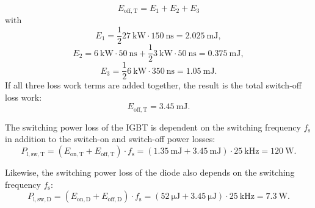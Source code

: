 \begin{solutionblock}
    \begin{equation}
    E_{\mathrm{off,T}} = E_{\mathrm{1}} + E_{\mathrm{2}} + E_{\mathrm{3}}
    \end{equation}
    with
    \begin{equation}
    E_{\mathrm{1}} = \frac{1}{2} \SI{27}{\kilo\watt} \cdot \SI{150}{\ns} = \SI {2.025}{\milli\joule},
    \end{equation}
    \begin{equation}
    E_{\mathrm{2}} = \SI{6}{\kilo\watt} \cdot \SI{50}{\ns} + \frac{1}{2} \SI{3}{\kilo\watt} \cdot \SI{50}{\ns} = \SI {0.375}{\milli\joule},
    \end{equation}
    \begin{equation}
        E_{\mathrm{3}} = \frac{1}{2} \SI{6}{\kilo\watt} \cdot \SI{350}{\ns} = \SI {1.05}{\milli\joule}.
        \end{equation}
    If all three loss work terms are added together, the result is the total switch-off loss work:
    \begin{equation}
        E_{\mathrm{off,T}} =  \SI {3.45}{\milli\joule}.
    \end{equation}

    

\end{solutionblock}


\begin{solutionblock}
The switching power loss of the IGBT is dependent on the switching frequency $f_{\mathrm{s}}$ in addition to the switch-on and switch-off power losses:
\begin{equation}
    P_{\mathrm{l,sw,T}} =  (E_{\mathrm{on,T}} +  E_{\mathrm{off,T}}) \cdot f_{\mathrm{s}} = (\SI {1.35}{\milli\joule} + \SI {3.45}{\milli\joule}) \cdot \SI {25}{\kilo\hertz} = \SI {120}{\watt}.
 \end{equation}

 Likewise, the switching power loss of the diode also depends on the switching frequency $f_{\mathrm{s}}$:
 \begin{equation}
    P_{\mathrm{l,sw,D}} =  (E_{\mathrm{on,D}} +  E_{\mathrm{off,D}}) \cdot f_{\mathrm{s}} = (\SI {52}{\micro\joule} + \SI {3.45}{\micro\joule}) \cdot \SI {25}{\kilo\hertz} = \SI {7.3}{\watt}.
 \end{equation}
\end{solutionblock}

